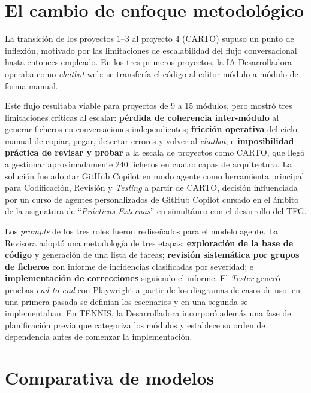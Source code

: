 \section{El cambio de enfoque metodológico} \label{sec:approach-change}

La transición de los proyectos 1--3 al proyecto 4 (\ac{CARTO}) supuso un punto de inflexión, motivado por las limitaciones de escalabilidad del flujo conversacional hasta entonces empleado. En los tres primeros proyectos, la \ac{IA} Desarrolladora operaba como \textit{chatbot} web: se transfería el código al editor módulo a módulo de forma manual. 

Este flujo resultaba viable para proyectos de 9 a 15 módulos, pero mostró tres limitaciones críticas al escalar: \textbf{pérdida de coherencia inter-módulo} al generar ficheros en conversaciones independientes; \textbf{fricción operativa} del ciclo manual de copiar, pegar, detectar errores y volver al \textit{chatbot}; e \textbf{imposibilidad práctica de revisar y probar} a la escala de proyectos como \ac{CARTO}, que llegó a gestionar aproximadamente 240 ficheros en cuatro capas de arquitectura. La solución fue adoptar GitHub Copilot en modo agente como herramienta principal para Codificación, Revisión y \textit{Testing} a partir de \ac{CARTO}, decisión influenciada por un curso de agentes personalizados de GitHub Copilot cursado en el ámbito de la asignatura de ``\textit{Prácticas Externas}'' en simultáneo con el desarrollo del \ac{TFG}.

Los \textit{prompts} de los tres roles fueron rediseñados para el modelo agente. La Revisora adoptó una metodología de tres etapas: \textbf{exploración de la base de código} y generación de una lista de tareas; \textbf{revisión sistemática por grupos de ficheros} con informe de incidencias clasificadas por severidad; e \textbf{implementación de correcciones} siguiendo el informe. El \textit{Tester} generó pruebas \textit{end-to-end} con Playwright a partir de los diagramas de casos de uso: en una primera pasada se definían los escenarios y en una segunda se implementaban. En \ac{TENNIS}, la Desarrolladora incorporó además una fase de planificación previa que categoriza los módulos y establece su orden de dependencia antes de comenzar la implementación.

\section{Comparativa de modelos} \label{sec:comparativa-modelos}


